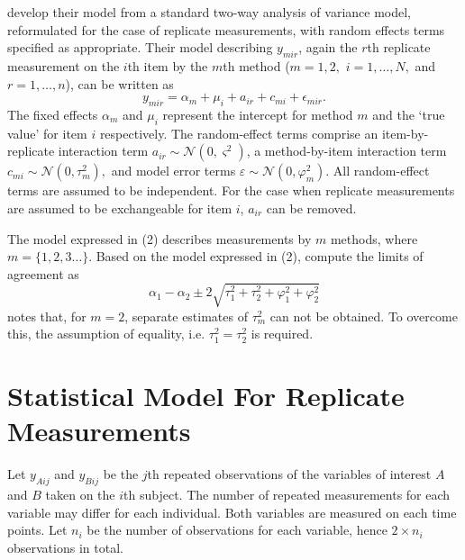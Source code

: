 \documentclass[12pt, a4paper]{report}
\theoremstyle{plain}
\theoremstyle{definition}
\theoremstyle{remark}
\begin{document}
	\citet{BXC2008} develop their model from a standard two-way analysis of variance model, reformulated for the case of replicate measurements, with random effects terms specified as appropriate. 
	Their model describing $y_{mir} $, again the $r$th replicate measurement on the $i$th item by the $m$th method ($m=1,2,$ $i=1,\ldots,N,$ and $r = 1,\ldots,n$), can be written as
	\begin{equation}\label{BXC-model}
		y_{mir}  = \alpha_{m} + \mu_{i} + a_{ir} + c_{mi} + \epsilon_{mir}.
	\end{equation}
	The fixed effects $\alpha_{m}$ and $\mu_{i}$  represent the intercept for method $m$ and the `true value' for item $i$ respectively. The random-effect terms comprise an item-by-replicate interaction term $a_{ir} \sim \mathcal{N}(0,\varsigma^{2})$, a method-by-item interaction term $c_{mi} \sim \mathcal{N}(0,\tau^{2}_{m}),$ and model error terms $\varepsilon \sim \mathcal{N}(0,\varphi^{2}_{m}).$ All random-effect terms are assumed to be independent.
	For the case when replicate measurements are assumed to be exchangeable for item $i$, $a_{ir}$ can be removed.
	
	The model expressed in (2) describes measurements by $m$ methods, where $m = \{1,2,3\ldots\}$. Based on the model expressed in (2), \citet{BXC2008} compute the limits of agreement as
	\[
	\alpha_1 - \alpha_2 \pm 2 \sqrt{ \tau^2_1 +  \tau^2_2 +  \varphi^2_1 +  \varphi^2_2 }
	\]
	\citet{BXC2008} notes that, for $m=2$,  separate estimates of $\tau^2_m$ can not be obtained. To overcome this, the assumption of equality, i.e. $\tau^2_1 = \tau^2_2$ is required.
	
	
	\section{Statistical Model For Replicate Measurements}
	Let $y_{Aij}$ and $y_{Bij}$ be the $j$th repeated observations of the variables of interest $A$ and $B$ taken on the $i$th subject. The number of repeated measurements for each variable may differ for each individual.
	Both variables are measured on each time points. Let $n_{i}$ be the number of observations for each variable, hence $2\times n_{i}$ observations in total.
	
\end{document}
